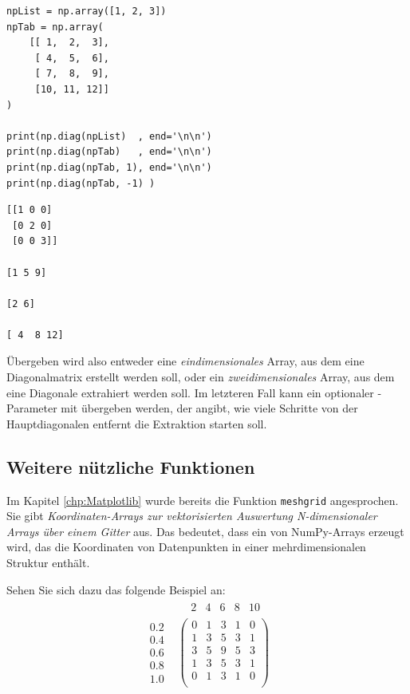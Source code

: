 \begin{tcbraster}[raster columns=2,
                  raster equal height,
                  nobeforeafter,
                  raster column skip=0.5cm]
\begin{codebox}
\begin{verbatim}
npList = np.array([1, 2, 3])
npTab = np.array(
    [[ 1,  2,  3],
     [ 4,  5,  6],
     [ 7,  8,  9],
     [10, 11, 12]]
)

print(np.diag(npList)  , end='\n\n')
print(np.diag(npTab)   , end='\n\n')
print(np.diag(npTab, 1), end='\n\n')
print(np.diag(npTab, -1) )
\end{verbatim}
\end{codebox}
%
\begin{cmdbox}
\begin{verbatim}
[[1 0 0]
 [0 2 0]
 [0 0 3]]

[1 5 9]

[2 6]

[ 4  8 12]
\end{verbatim}
\end{cmdbox}
\end{tcbraster}

Übergeben wird also entweder eine \emph{eindimensionales} Array, aus dem eine Diagonalmatrix erstellt werden soll, oder ein \emph{zweidimensionales} Array, aus dem eine Diagonale extrahiert werden soll. Im letzteren Fall kann ein optionaler -Parameter mit übergeben werden, der angibt, wie viele Schritte von der Hauptdiagonalen entfernt die Extraktion starten soll.

\subsection{Weitere nützliche Funktionen}
Im Kapitel \ref{chp:Matplotlib} wurde bereits die Funktion \texttt{meshgrid} angesprochen. Sie gibt \emph{Koordinaten-Arrays zur vektorisierten Auswertung N-dimensionaler Arrays über einem Gitter} aus. Das bedeutet, dass ein  von NumPy-Arrays erzeugt wird, das die Koordinaten von Datenpunkten in einer mehrdimensionalen Struktur enthält.

Sehen Sie sich dazu das folgende Beispiel an:
\begin{align*}
	&
	\begin{matrix}
		& 2 & 4 & 6 & 8 & 10
	\end{matrix}
\\
%
	\begin{matrix}
		0.2 \\ 0.4 \\ 0.6 \\ 0.8 \\ 1.0
	\end{matrix}
&
	\begin{pmatrix}
		0 & 1 & 3 & 1 & 0 \\
		1 & 3 & 5 & 3 & 1 \\
		3 & 5 & 9 & 5 & 3 \\
		1 & 3 & 5 & 3 & 1 \\
		0 & 1 & 3 & 1 & 0 \\
	\end{pmatrix}
\end{align*}

